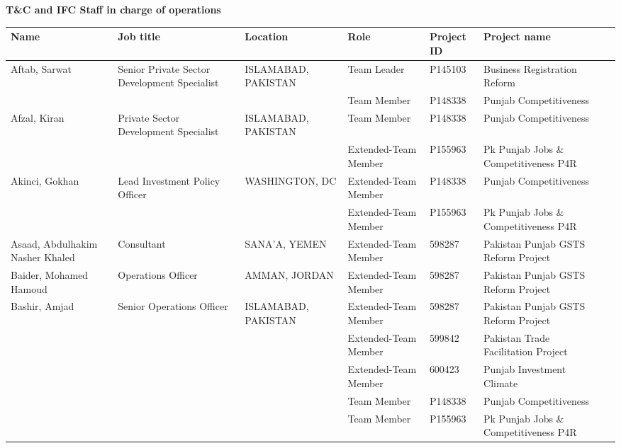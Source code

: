 \documentclass{article}\usepackage[]{graphicx}\usepackage[]{color}
\begin{document}
\begin{minipage}[b]{0.99\textwidth}
  \vspace*{1cm}
  \raggedright{\color{white!30!blue} \textbf{\large T\&C and IFC Staff in charge of operations}}
  \vspace*{0.5cm}
     
{\footnotesize
\begin{longtable}{>{\raggedright}p{1.4in}>{\raggedright}p{1in}>{\raggedright}p{1in}>{\raggedright}p{1in}l>{\raggedright}p{1.5in}l}
 Name & Job title & Location & Role & Project ID & Project name &  \\ 
  \hline
Aftab, Sarwat & Senior Private Sector Development Specialist & ISLAMABAD, PAKISTAN & Team Leader & P145103 & Business Registration Reform &  \\ 
   &  &  & Team Member & P148338 & Punjab Competitiveness &  \\ 
  Afzal, Kiran & Private Sector Development Specialist & ISLAMABAD, PAKISTAN & Team Member & P148338 & Punjab Competitiveness &  \\ 
   &  &  & Extended-Team Member & P155963 & Pk Punjab Jobs \& Competitiveness P4R &  \\ 
  Akinci, Gokhan & Lead Investment Policy Officer & WASHINGTON, DC & Extended-Team Member & P148338 & Punjab Competitiveness &  \\ 
   &  &  & Extended-Team Member & P155963 & Pk Punjab Jobs \& Competitiveness P4R &  \\ 
  Asaad, Abdulhakim Nasher Khaled & Consultant & SANA'A, YEMEN & Extended-Team Member & 598287 & Pakistan Punjab GSTS Reform Project &  \\ 
  Baider, Mohamed Hamoud & Operations Officer & AMMAN, JORDAN & Extended-Team Member & 598287 & Pakistan Punjab GSTS Reform Project &  \\ 
  Bashir, Amjad & Senior Operations Officer & ISLAMABAD, PAKISTAN & Extended-Team Member & 598287 & Pakistan Punjab GSTS Reform Project &  \\ 
   &  &  & Extended-Team Member & 599842 & Pakistan Trade Facilitation Project &  \\ 
   &  &  & Extended-Team Member & 600423 & Punjab Investment Climate &  \\ 
   &  &  & Team Member & P148338 & Punjab Competitiveness &  \\ 
   &  &  & Team Member & P155963 & Pk Punjab Jobs \& Competitiveness P4R &  \\ 

\end{longtable}}
\end{minipage}
\end{document}
